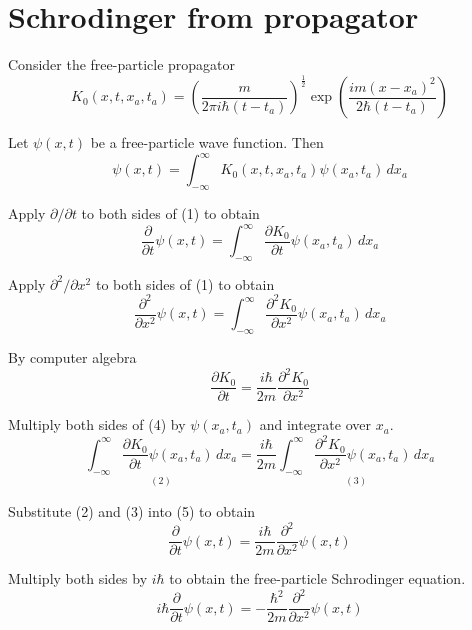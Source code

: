 

\section*{Schrodinger from propagator}

Consider the free-particle propagator
\begin{equation*}
K_0(x,t,x_a,t_a)=\left(\frac{m}{2\pi i\hbar(t-t_a)}\right)^\frac{1}{2}
\exp\left(\frac{im(x-x_a)^2}{2\hbar(t-t_a)}\right)
\end{equation*}

Let $\psi(x,t)$ be a free-particle wave function.
Then
\begin{equation*}
\psi(x,t)=\int_{-\infty}^\infty K_0(x,t,x_a,t_a)\psi(x_a,t_a)\,dx_a
\tag{1}
\end{equation*}

Apply $\partial/\partial t$ to both sides of (1) to obtain
\begin{equation*}
\frac{\partial}{\partial t}\psi(x,t)
=\int_{-\infty}^\infty\frac{\partial K_0}{\partial t}
\psi(x_a,t_a)\,dx_a
\tag{2}
\end{equation*}

Apply $\partial^2/\partial x^2$ to both sides of (1) to obtain
\begin{equation*}
\frac{\partial^2}{\partial x^2}\psi(x,t)
=\int_{-\infty}^\infty\frac{\partial^2 K_0}{\partial x^2}
\psi(x_a,t_a)\,dx_a
\tag{3}
\end{equation*}

By computer algebra
\begin{equation*}
\frac{\partial K_0}{\partial t}
=\frac{i\hbar}{2m}\frac{\partial^2K_0}{\partial x^2}
\tag{4}
\end{equation*}

Multiply both sides of (4) by $\psi(x_a,t_a)$ and integrate over $x_a$.
\begin{equation*}
\underset{(2)}{\int_{-\infty}^\infty\frac{\partial K_0}{\partial t}\psi(x_a,t_a)\,dx_a}
=\frac{i\hbar}{2m}\underset{(3)}
{\int_{-\infty}^\infty\frac{\partial^2K_0}{\partial x^2}
\psi(x_a,t_a)\,dx_a}
\tag{5}
\end{equation*}

Substitute (2) and (3) into (5) to obtain
\begin{equation*}
\frac{\partial}{\partial t}\psi(x,t)
=\frac{i\hbar}{2m}\frac{\partial^2}{\partial x^2}\psi(x,t)
\end{equation*}

Multiply both sides by $i\hbar$ to obtain the free-particle Schrodinger equation.
\begin{equation*}
i\hbar\frac{\partial}{\partial t}\psi(x,t)
=-\frac{\hbar^2}{2m}\frac{\partial^2}{\partial x^2}\psi(x,t)
\end{equation*}



